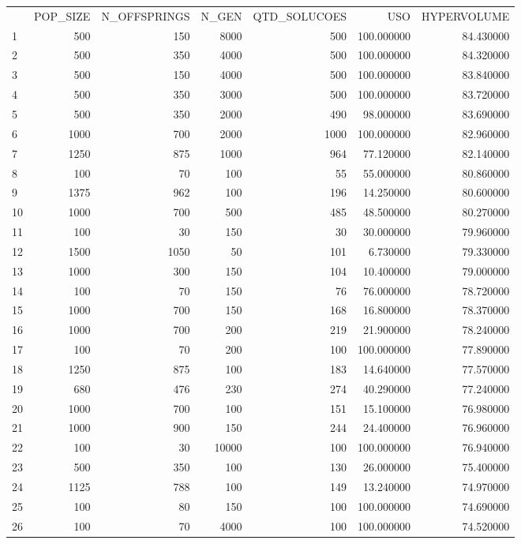 \begin{tabular}{lrrrrrr}
 & POP_SIZE & N_OFFSPRINGS & N_GEN & QTD_SOLUCOES & USO & HYPERVOLUME \\
1 & 500 & 150 & 8000 & 500 & 100.000000 & 84.430000 \\
2 & 500 & 350 & 4000 & 500 & 100.000000 & 84.320000 \\
3 & 500 & 150 & 4000 & 500 & 100.000000 & 83.840000 \\
4 & 500 & 350 & 3000 & 500 & 100.000000 & 83.720000 \\
5 & 500 & 350 & 2000 & 490 & 98.000000 & 83.690000 \\
6 & 1000 & 700 & 2000 & 1000 & 100.000000 & 82.960000 \\
7 & 1250 & 875 & 1000 & 964 & 77.120000 & 82.140000 \\
8 & 100 & 70 & 100 & 55 & 55.000000 & 80.860000 \\
9 & 1375 & 962 & 100 & 196 & 14.250000 & 80.600000 \\
10 & 1000 & 700 & 500 & 485 & 48.500000 & 80.270000 \\
11 & 100 & 30 & 150 & 30 & 30.000000 & 79.960000 \\
12 & 1500 & 1050 & 50 & 101 & 6.730000 & 79.330000 \\
13 & 1000 & 300 & 150 & 104 & 10.400000 & 79.000000 \\
14 & 100 & 70 & 150 & 76 & 76.000000 & 78.720000 \\
15 & 1000 & 700 & 150 & 168 & 16.800000 & 78.370000 \\
16 & 1000 & 700 & 200 & 219 & 21.900000 & 78.240000 \\
17 & 100 & 70 & 200 & 100 & 100.000000 & 77.890000 \\
18 & 1250 & 875 & 100 & 183 & 14.640000 & 77.570000 \\
19 & 680 & 476 & 230 & 274 & 40.290000 & 77.240000 \\
20 & 1000 & 700 & 100 & 151 & 15.100000 & 76.980000 \\
21 & 1000 & 900 & 150 & 244 & 24.400000 & 76.960000 \\
22 & 100 & 30 & 10000 & 100 & 100.000000 & 76.940000 \\
23 & 500 & 350 & 100 & 130 & 26.000000 & 75.400000 \\
24 & 1125 & 788 & 100 & 149 & 13.240000 & 74.970000 \\
25 & 100 & 80 & 150 & 100 & 100.000000 & 74.690000 \\
26 & 100 & 70 & 4000 & 100 & 100.000000 & 74.520000 \\

\end{tabular}
